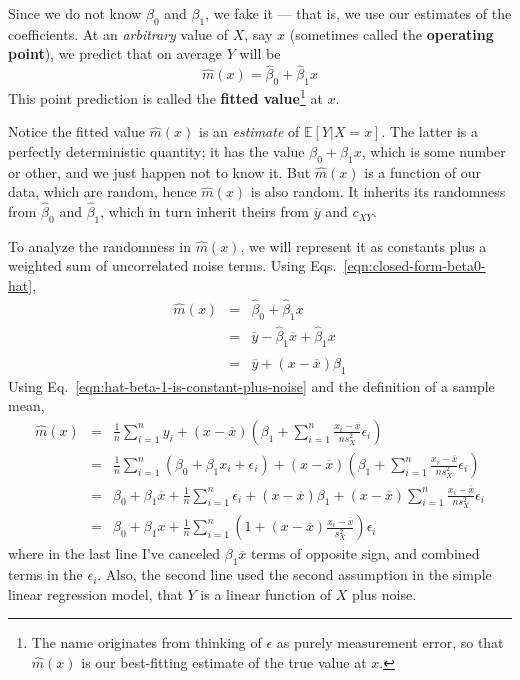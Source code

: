 \documentclass{article}
\newcommand{\Expect}[1]{\mathbb{E}\left[ #1 \right]}
\begin{document}
Since we do not know $\beta_0$ and $\beta_1$, we fake it --- that is, we use
our estimates of the coefficients.  At an {\em arbitrary} value of $X$, say $x$
(sometimes called the {\bf operating point}), we predict that on average $Y$
will be
\begin{equation}
\hat{m}(x) = \hat{\beta}_0 + \hat{\beta}_1 x
\end{equation}
This point prediction is called the {\bf fitted value}\footnote{The name
  originates from thinking of $\epsilon$ as purely measurement error, so that
  $\hat{m}(x)$ is our best-fitting estimate of the true value at $x$.} at $x$.

Notice the fitted value $\hat{m}(x)$ is an {\em estimate} of $\Expect{Y|X=x}$.
The latter is a perfectly deterministic quantity; it has the value $\beta_0 +
\beta_1 x$, which is some number or other, and we just happen not to know it.
But $\hat{m}(x)$ is a function of our data, which are random, hence
$\hat{m}(x)$ is also random.  It inherits its randomness from $\hat{\beta}_0$
and $\hat{\beta}_1$, which in turn inherit theirs from $\overline{y}$ and
$c_{XY}$.

To analyze the randomness in $\hat{m}(x)$, we will represent it as constants
plus a weighted sum of uncorrelated noise terms.  Using Eqs.\ \ref{eqn:closed-form-beta0-hat},
\begin{eqnarray}
\hat{m}(x) & = & \hat{\beta}_0 + \hat{\beta}_1 x \\
& = & \overline{y} - \hat{\beta}_1 \overline{x} + \hat{\beta}_1 x\\
& = & \overline{y} + (x-\overline{x})\hat{\beta}_1
\end{eqnarray}
Using Eq.\ \ref{eqn:hat-beta-1-is-constant-plus-noise} and the definition of a
sample mean,
\begin{eqnarray}
\hat{m}(x) & = & \frac{1}{n}\sum_{i=1}^{n}{y_i} + (x -\overline{x})\left( \beta_1 + \sum_{i=1}^{n}{\frac{x_i - \overline{x}}{ns^2_X}\epsilon_i} \right)\\
& = & \frac{1}{n}\sum_{i=1}^{n}{(\beta_0 + \beta_1 x_i + \epsilon_i)}
+ (x -\overline{x})\left( \beta_1 + \sum_{i=1}^{n}{\frac{x_i - \overline{x}}{ns^2_X}\epsilon_i} \right)\\
& = & \beta_0 + \beta_1 \overline{x} + \frac{1}{n}\sum_{i=1}^{n}{\epsilon_i}
+ (x-\overline{x})\beta_1 + (x-\overline{x})\sum_{i=1}^{n}{\frac{x_i - \overline{x}}{ns^2_X}\epsilon_i}\\
& = & \beta_0 + \beta_1 x + \frac{1}{n}\sum_{i=1}^{n}{\left(1 + (x-\overline{x}) \frac{x_i - \overline{x}}{s^2_X} \right) \epsilon_i} \label{eqn:prediction-as-constant-plus-noise}
\end{eqnarray}
where in the last line I've canceled $\beta_1 \overline{x}$ terms of opposite
sign, and combined terms in the $\epsilon_i$.  Also, the second line used the
second assumption in the simple linear regression model, that $Y$ is a linear
function of $X$ plus noise.
\end{document}

